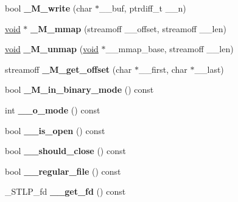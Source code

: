 \begin{DoxyCompactItemize}
bool {\bfseries \+\_\+\+M\+\_\+write} (char $\ast$\+\_\+\+\_\+buf, ptrdiff\+\_\+t \+\_\+\+\_\+n)
\item 
\mbox{\label{class___filebuf__base_a53e25186437cd543b4ab00498af1a98c}} 
\hyperlink{interfacevoid}{void} $\ast$ {\bfseries \+\_\+\+M\+\_\+mmap} (streamoff \+\_\+\+\_\+offset, streamoff \+\_\+\+\_\+len)
\item 
\mbox{\label{class___filebuf__base_a45de8419f6d63d7152b1ce4b35b13f6f}} 
\hyperlink{interfacevoid}{void} {\bfseries \+\_\+\+M\+\_\+unmap} (\hyperlink{interfacevoid}{void} $\ast$\+\_\+\+\_\+mmap\+\_\+base, streamoff \+\_\+\+\_\+len)
\item 
\mbox{\label{class___filebuf__base_ab16608c681eebf950cc58007eaea7400}} 
streamoff {\bfseries \+\_\+\+M\+\_\+get\+\_\+offset} (char $\ast$\+\_\+\+\_\+first, char $\ast$\+\_\+\+\_\+last)
\item 
\mbox{\label{class___filebuf__base_acb80b0f6bf615ca01ac8e0d9c4ad90bb}} 
bool {\bfseries \+\_\+\+M\+\_\+in\+\_\+binary\+\_\+mode} () const
\item 
\mbox{\label{class___filebuf__base_aa2c9ecccee6cffcc0fe0fe971f6901e0}} 
int {\bfseries \+\_\+\+\_\+o\+\_\+mode} () const
\item 
\mbox{\label{class___filebuf__base_a007f3ca8281ebda0f62b1435892e39ba}} 
bool {\bfseries \+\_\+\+\_\+is\+\_\+open} () const
\item 
\mbox{\label{class___filebuf__base_a29ea192532a89eb33a4aede047ba52d6}} 
bool {\bfseries \+\_\+\+\_\+should\+\_\+close} () const
\item 
\mbox{\label{class___filebuf__base_a2c17ff63b502c09c49b87a5b818b96ab}} 
bool {\bfseries \+\_\+\+\_\+regular\+\_\+file} () const
\item 
\mbox{\label{class___filebuf__base_a980a0b33717cf0de9a14ac032dceff55}} 
\+\_\+\+S\+T\+L\+P\+\_\+fd {\bfseries \+\_\+\+\_\+get\+\_\+fd} () const
\end{DoxyCompactItemize}
